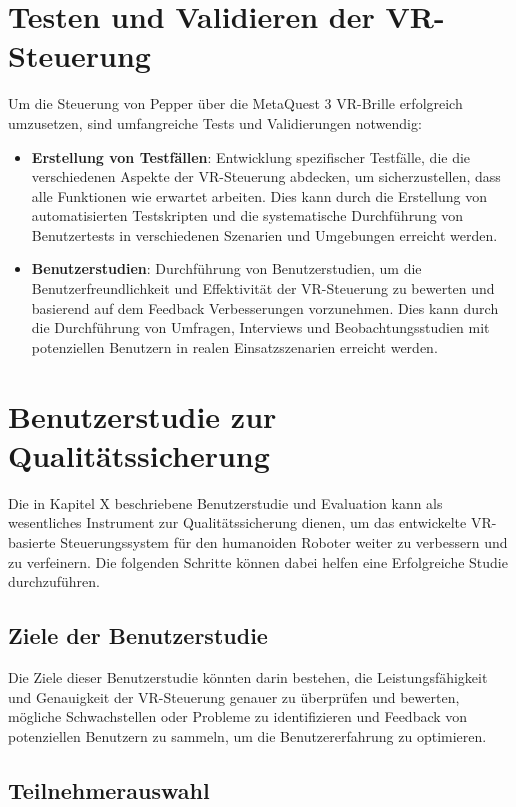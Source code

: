 \section{Testen und Validieren der VR-Steuerung}
Um die Steuerung von Pepper über die MetaQuest 3 VR-Brille erfolgreich umzusetzen, sind umfangreiche Tests und Validierungen notwendig:
\begin{itemize}
    \item \textbf{Erstellung von Testfällen}: Entwicklung spezifischer Testfälle, die die verschiedenen Aspekte der VR-Steuerung abdecken, um sicherzustellen, dass alle Funktionen wie erwartet arbeiten. Dies kann durch die Erstellung von automatisierten Testskripten und die systematische Durchführung von Benutzertests in verschiedenen Szenarien und Umgebungen erreicht werden.
    \item \textbf{Benutzerstudien}: Durchführung von Benutzerstudien, um die Benutzerfreundlichkeit und Effektivität der VR-Steuerung zu bewerten und basierend auf dem Feedback Verbesserungen vorzunehmen. Dies kann durch die Durchführung von Umfragen, Interviews und Beobachtungsstudien mit potenziellen Benutzern in realen Einsatzszenarien erreicht werden.
\end{itemize}
\section{Benutzerstudie zur Qualitätssicherung}

Die in Kapitel X beschriebene Benutzerstudie und Evaluation kann als wesentliches Instrument zur Qualitätssicherung dienen, um das entwickelte VR-basierte Steuerungssystem für den humanoiden Roboter weiter zu verbessern und zu verfeinern. Die folgenden Schritte können dabei helfen eine Erfolgreiche Studie durchzuführen.

\subsection{Ziele der Benutzerstudie}

Die Ziele dieser Benutzerstudie könnten darin bestehen, die Leistungsfähigkeit und Genauigkeit der VR-Steuerung genauer zu überprüfen und bewerten, mögliche Schwachstellen oder Probleme zu identifizieren und Feedback von potenziellen Benutzern zu sammeln, um die Benutzererfahrung zu optimieren.

\subsection{Teilnehmerauswahl}

